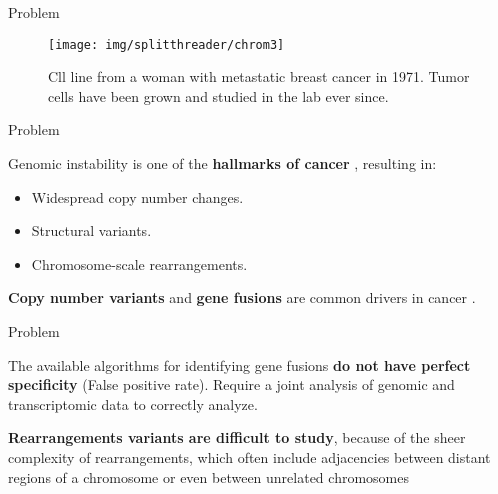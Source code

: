 \documentclass[10pt]{beamer}
\newcommand{\1}{
        	\setbeamertemplate{background}{
        		\texttt{[image: img/1\_BIO]}
        		\tikz[overlay] \fill[fill opacity=0.75,fill=white] (0,0) rectangle (-\paperwidth,\paperheight);
        	}
}
\begin{document}
\begin{frame}{Problem}{}
	\begin{figure}
		\centering
		\texttt{[image: img/splitthreader/chrom3]}
		\caption{Cll line from a woman with metastatic breast cancer in 1971. Tumor cells have been grown and studied in the lab ever since.}
	\end{figure}		
\end{frame}



\begin{frame}{Problem}{}		
	\begin{block}{}		
		Genomic instability is one of the \textbf{hallmarks of cancer} \cite{hanahan2011hallmarks,hastings2009mechanisms},	resulting in:
		\begin{itemize}
			\item Widespread copy number changes.
			\item Structural variants.
			\item Chromosome-scale rearrangements.
		\end{itemize}			
	\end{block}	

	\begin{block}{}		
		\textbf{Copy number variants} and \textbf{gene fusions} are common drivers in cancer \cite{shlien2009copy, mitelman2007impact}.
	\end{block}	
\end{frame}


\begin{frame}{Problem}{}
	\begin{block}{}
		The available algorithms for identifying gene fusions \textbf{do not have perfect specificity} (False positive rate). Require a joint	analysis of genomic and transcriptomic data to correctly analyze.
	\end{block}

	\begin{block}{}
		\textbf{Rearrangements variants are difficult to study}, because of the sheer complexity of rearrangements, which often include adjacencies between distant regions of a chromosome or even between unrelated chromosomes
	\end{block}

\end{frame}
\end{document}
